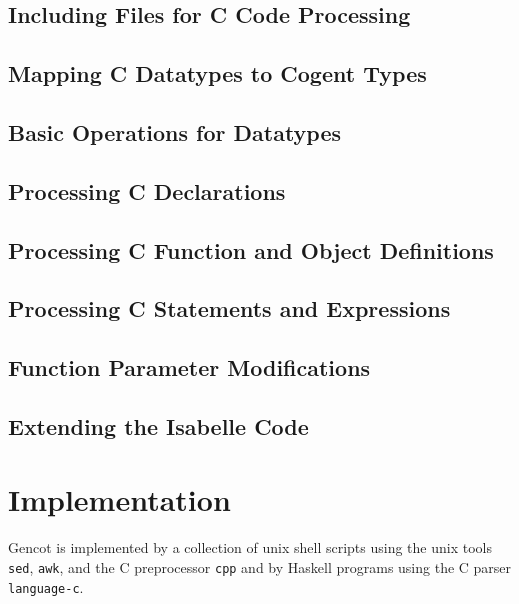 \documentclass[a4paper]{report}
\newcommand{\code}[1]{\textnormal{\texttt{#1}}}
\begin{document}
\section{Including Files for C Code Processing}
\label{design-ccode}


\section{Mapping C Datatypes to Cogent Types}
\label{design-types}


\section{Basic Operations for Datatypes}
\label{design-operations}


\section{Processing C Declarations}
\label{design-decls}


\section{Processing C Function and Object Definitions}
\label{design-fundefs}


\section{Processing C Statements and Expressions}
\label{design-cstats}


\section{Function Parameter Modifications}
\label{design-parmod}


\section{Extending the Isabelle Code}
\label{design-isabelle}


\chapter{Implementation}

Gencot is implemented by a collection of unix shell scripts using the unix tools \code{sed}, \code{awk}, and the 
C preprocessor \code{cpp} and by Haskell programs using the C parser \code{language-c}. 
\end{document}
